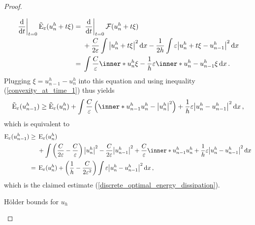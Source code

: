 \begin{proof}
\begin{description}[wide=0pt]
\begin{align*}
		\left. \dv{ t } \right|_{ t= 0 }
			\tilde{\energy}_{ \varepsilon} ( u_{ n }^{ h } + t \xi )
		={}&
		\left. \dv{ t } \right|_{ t = 0 } 
			\mathcal{ F } ( u_{ n }^{ h } + t \xi )
		\\
		{}&+ 
		\frac{ C }{ 2 \varepsilon } 
		\int 
			\abs{ u_{ n }^{ h } + t \xi }^{ 2 } 
		\dd{ x }
		-
		\frac{ 1 }{ 2h } 
		\int 
			\varepsilon
			\abs{ u_{n }^{ h } + t \xi - u_{ n - 1 }^{ h } }^{ 2 } 
		\dd{ x }
		\\
		={}& 
		\int
			\frac{ C }{ \varepsilon }
			\inner*{u_{ n }^{ h }}{\xi}
			-
			\frac{ 1 }{ h }
			\varepsilon
			\inner*{ u_{ n }^{ h } - u_{ n - 1 } ^{ h } }{ \xi }
		\dd{x}.
	\end{align*}
	Plugging $ \xi = u_{ n - 1 }^{ h } - u_{ n }^{ h } $ into this equation and using inequality (\ref{convexity_at_time_1})  thus yields
	\begin{equation*}
		\tilde{\energy}_{ \varepsilon } ( u_{ n - 1 }^{ h } ) 
		\geq
		\tilde{\energy}_{ \varepsilon} ( u_{ n }^{ h } )
		+
		\int
			\frac{ C }{ \varepsilon } 
			\left(
				\inner*{ u_{ n - 1 }^{ h } }{ u_{n }^{ h }}
				-
				\abs{ u_{ n }^{ h }}^{ 2 }
			\right)
			+
			\frac{ 1 }{ h }
			\varepsilon
			\abs{ u_{n }^{ h } - u_{ n -1 }^{ h } }^{ 2 }
		\dd{ x },
	\end{equation*}
	which is equivalent to
	\begin{align*}
		\energy_{ \varepsilon } (u_{ n - 1 }^{ h } )
		\geq {} &
		\energy_{ \varepsilon } (u_{ n }^{ h } )
		\\
		& +
		\int
			\left(
				\frac{ C }{ 2 \varepsilon }
				-
				\frac{ C }{ \varepsilon }
			\right)
			\abs{ u_{ n }^{ h } }^{ 2 }
			-
			\frac{ C }{ 2 \varepsilon }
			\abs{ u_{n - 1 }^{ h } }^{ 2 }
			+ 
			\frac{ C }{ \varepsilon }
			\inner*{ u_{ n - 1 }^{ h } }{ u_{ n }^{ h } }
			+ 
			\frac{ 1 }{ h }
			\varepsilon
			\abs{ u_{ n }^{ h } - u_{ n - 1 }^{ h } }^{ 2 }
		\dd{ x }
		\\
		= {} &
		\energy_{ \varepsilon } ( u_{n }^{ h } )
		+
		\left( 
			\frac{ 1 }{ h }
			- 
			\frac{ C }{ 2 \varepsilon^{ 2 } }
		\right)
		\int 
			\varepsilon \abs{ u_{n }^{ h } - u_{ n - 1 }^{ h } }^{ 2 }
		\dd{ x },
	\end{align*}
	which is the claimed estimate (\ref{discrete_optimal_energy_dissipation}).
	
	\item[Step 4:] Hölder bounds for $ u_{ h } $
	

\end{description}
\end{proof}
